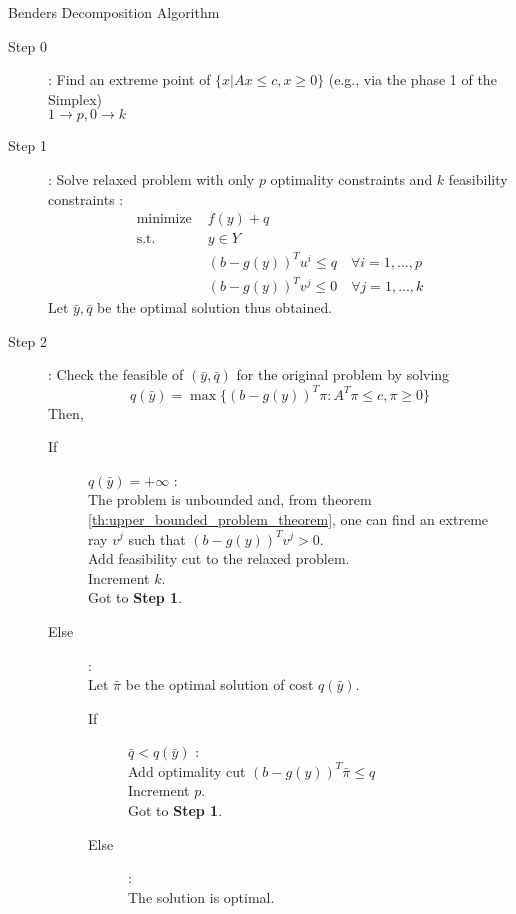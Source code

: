 \begin{algorithm}[h!]
    \caption{Benders Decomposition Algorithm}
    \label{alg:benders}
    \begin{description}
        \item[Step 0] : Find an extreme point of $\{x|Ax\le c, x\ge 0\}$ (e.g., via the phase 1 of the Simplex)\\$1\rightarrow p, 0\rightarrow k$
        \item[Step 1] : Solve relaxed problem with only $p$ optimality constraints and $k$ feasibility constraints :
        \begin{align*}
            \textrm{minimize } & f(y) + q\\
            \textrm{s.t. } & y\in Y\\
            & (b-g(y))^Tu^i \le q\quad\forall i=1,...,p\\
            & (b-g(y))^Tv^j \le 0\quad\forall j=1,...,k
        \end{align*}
        Let $\bar y, \bar q$ be the optimal solution thus obtained. 
        \item[Step 2] : Check the feasible of $(\bar y, \bar q)$ for the original problem by solving \[ q(\bar y) = \max\{ (b-g(y))^T\pi : A^T\pi \le c, \pi\ge 0 \} \]
        Then,
        \begin{description}
            \item[If] $q(\bar y) = +\infty$ : \\
            The problem is unbounded and, from theorem \ref{th:upper_bounded_problem_theorem}, one can find an extreme ray $v^j$ such that $(b-g(y))^Tv^j > 0$. \\
            Add feasibility cut to the relaxed problem.\\
            Increment $k$. \\
            Got to \textbf{Step 1}.
            \item[Else] : \\
            Let $\bar\pi$ be the optimal solution of cost $q(\bar y)$. 
            \begin{description}
                \item[If] $\bar q < q(\bar y)$ :\\
                Add optimality cut $(b-g(y))^T\bar\pi\le q$\\
                Increment $p$.\\
                Got to \textbf{Step 1}.
                \item[Else] :\\
                The solution is optimal.
            \end{description}
        \end{description}
    \end{description}
\end{algorithm}


